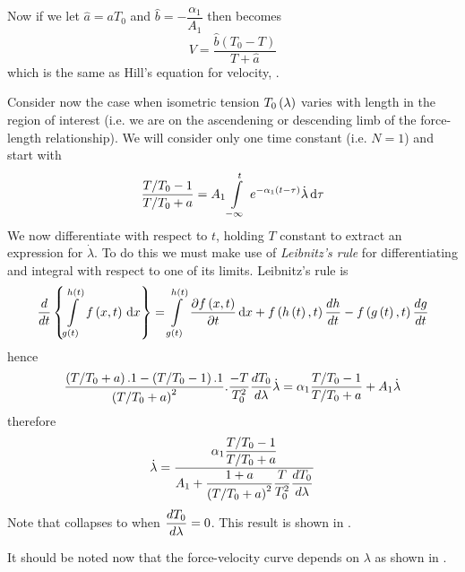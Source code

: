 
Now if we let $\hat{a}=aT_{0}$ and $\hat{b}=-\dfrac{\alpha_{1}}{A_{1}}$ then
 becomes
\begin{equation*}
  V=\dfrac{\hat{b}(T_{0}-T)}{T+\hat{a}}
\end{equation*}
which is the same as Hill's equation for velocity, .

Consider now the case when isometric tension $ T_{0}\left( \lambda \right) $ varies
with length in the region of interest (i.e. we are on the ascendening or
descending limb of the force-length relationship). We will consider only one
time constant (i.e. $N=1$) and start with
\begin{equation*}
   \dfrac{T/T_{0}-1}{T/T_{0}+a}=A_{1}\gint{-\infty}{t}{e^{-\alpha_{1}
       \pbrac{t-\tau}}\dot{\lambda}}{\tau}
\end{equation*}
We now differentiate with respect to $t$, holding $T$ constant to extract an
expression for $\dot{\lambda}$. To do this we must make use of \emph{Leibnitz's
  rule} for differentiating and integral with respect to one of its
limits. Leibnitz's rule is
\begin{equation*}
  \dby{ }{t}\bbrac{\gint{\fnof{g}{t}}{\fnof{h}{t}}{\fnof{f}{x,t}}{x}}=
  \gint{\fnof{g}{t}}{\fnof{h}{t}}{\delby{\fnof{f}{x,t}}{t}}{x}+
  \fnof{f}{\fnof{h}{t},t}\dby{h}{t}-\fnof{f}{\fnof{g}{t},t}\dby{g}{t}
\end{equation*}
hence
\begin{equation*}
  \dfrac{\left( T/T_{0}+a \right).1-\left( T/T_{0}-1 \right).1}{\left( T/T_{0}+a \right)^{2}}.
  \dfrac{-T}{T_{0}^{2}} \dfrac{ d T_{0}}{d \lambda} \dot{\lambda}=\alpha_{1}
  \dfrac{T/T_{0}-1}{T/T_{0}+a} + A_{1}\dot{\lambda}
\end{equation*}
therefore
\begin{equation}
  \dot{\lambda}=\dfrac{\alpha_{1}\dfrac{T/T_{0}-1}{T/T_{0}+a}}
  {A_{1}+\dfrac{1+a}{\left( T/T_{0}+a \right)^{2}}\dfrac{T}{T_{0}^{2}}
     \dfrac{ d T_{0}}{d \lambda} }
  \label{eqn:fmtransresponse2}
\end{equation}
Note that  collapses to
 when $ \dfrac{ d T_{0}}{d \lambda} =0$. This result is
shown in .


It should be noted now that the force-velocity curve depends on $\lambda$ as
shown in .

